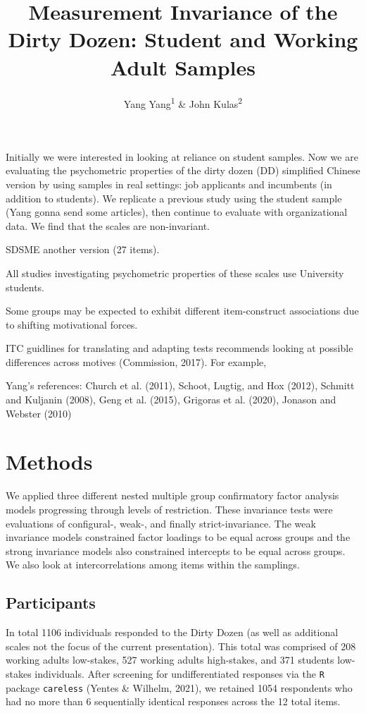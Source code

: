 \documentclass[
  english,
  man]{apa6}
\title{Measurement Invariance of the Dirty Dozen: Student and Working Adult Samples}
\author{Yang Yang\textsuperscript{1} \& John Kulas\textsuperscript{2}}
\date{}
\affiliation{\vspace{0.5cm}\textsuperscript{1} Roche\\\textsuperscript{2} Montclair State University}
\begin{document}
\maketitle

Initially we were interested in looking at reliance on student samples. Now we are evaluating the psychometric properties of the dirty dozen (DD) simplified Chinese version by using samples in real settings: job applicants and incumbents (in addition to students). We replicate a previous study using the student sample (Yang gonna send some articles), then continue to evaluate with organizational data. We find that the scales are non-invariant.

SDSME another version (27 items).

All studies investigating psychometric properties of these scales use University students.

Some groups may be expected to exhibit different item-construct associations due to shifting motivational forces.

ITC guidlines for translating and adapting tests recommends looking at possible differences across motives (Commission, 2017). For example,

Yang's references: Church et al. (2011), Schoot, Lugtig, and Hox (2012), Schmitt and Kuljanin (2008), Geng et al. (2015), Grigoras et al. (2020), Jonason and Webster (2010)

\hypertarget{methods}{%
\section{Methods}\label{methods}}

We applied three different nested multiple group confirmatory factor analysis models progressing through levels of restriction. These invariance tests were evaluations of configural-, weak-, and finally strict-invariance. The weak invariance models constrained factor loadings to be equal across groups and the strong invariance models also constrained intercepts to be equal across groups. We also look at intercorrelations among items within the samplings.

\hypertarget{participants}{%
\subsection{Participants}\label{participants}}

In total 1106 individuals responded to the Dirty Dozen (as well as additional scales not the focus of the current presentation). This total was comprised of 208 working adults low-stakes, 527 working adults high-stakes, and 371 students low-stakes individuals. After screening for undifferentiated responses via the \texttt{R} package \texttt{careless} (Yentes \& Wilhelm, 2021), we retained 1054 respondents who had no more than 6 sequentially identical responses across the 12 total items.
\end{document}
